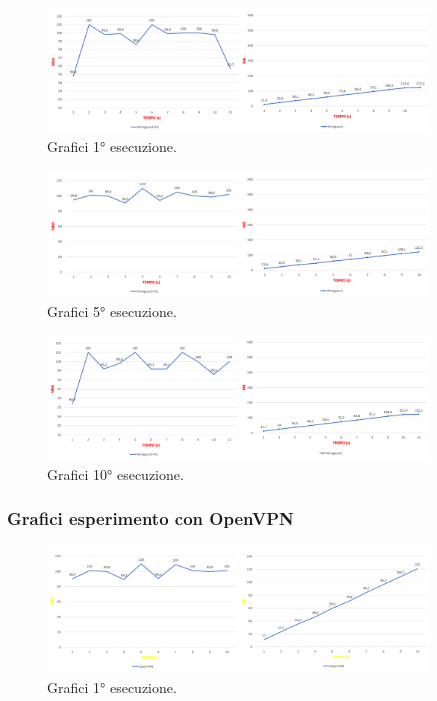 \begin{figure}[h] \includegraphics[width=0.9\textwidth] {Tesi magistrale/capitoli/images/33.png}
\centering
\caption{Grafici 1° esecuzione.}
\end{figure}

\begin{figure}[h] \includegraphics[width=0.9\textwidth] {Tesi magistrale/capitoli/images/34.png}
\centering
\caption{Grafici 5° esecuzione.}
\end{figure}

\begin{figure}[h] \includegraphics[width=0.9\textwidth] {Tesi magistrale/capitoli/images/35.png}
\centering
\caption{Grafici 10° esecuzione.}
\end{figure}

\newpage
\subsubsection{Grafici esperimento con OpenVPN}

\begin{figure}[h] \includegraphics[width=0.9\textwidth] {Tesi magistrale/capitoli/images/42.png}
\centering
\caption{Grafici 1° esecuzione.}
\end{figure}

